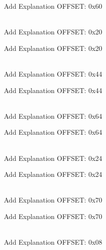 \begin{DoxyRefList}
\label{todo__todo000115}%
%
Add Explanation OFFSET\+: 0x60  
\item[{\parbox[t]{\linewidth}{Member \doxylink{struct_r_c_c___reg_def__t_acfa79aca8487958412be8f32e4632b47}{RCC\+\_\+\+Reg\+Def\+\_\+t\+::APB1\+RSTR} }}]\hfill \\
\label{todo__todo000029}%
%
Add Explanation OFFSET\+: 0x20 

\label{todo__todo000099}%
%
Add Explanation OFFSET\+: 0x20  
\item[{\parbox[t]{\linewidth}{Member \doxylink{struct_r_c_c___reg_def__t_aa5211a53246098ec97c0e360759c5ad8}{RCC\+\_\+\+Reg\+Def\+\_\+t\+::APB2\+ENR} }}]\hfill \\
\label{todo__todo000038}%
%
Add Explanation OFFSET\+: 0x44 

\label{todo__todo000108}%
%
Add Explanation OFFSET\+: 0x44  
\item[{\parbox[t]{\linewidth}{Member \doxylink{struct_r_c_c___reg_def__t_ab7a6c876d40b24bc87fa77108508271d}{RCC\+\_\+\+Reg\+Def\+\_\+t\+::APB2\+LPENR} }}]\hfill \\
\label{todo__todo000046}%
%
Add Explanation OFFSET\+: 0x64 

\label{todo__todo000116}%
%
Add Explanation OFFSET\+: 0x64  
\item[{\parbox[t]{\linewidth}{Member \doxylink{struct_r_c_c___reg_def__t_a6c1588013b885c32b78b912e8249a26c}{RCC\+\_\+\+Reg\+Def\+\_\+t\+::APB2\+RSTR} }}]\hfill \\
\label{todo__todo000030}%
%
Add Explanation OFFSET\+: 0x24 

\label{todo__todo000100}%
%
Add Explanation OFFSET\+: 0x24  
\item[{\parbox[t]{\linewidth}{Member \doxylink{struct_r_c_c___reg_def__t_a59a53b5462384295a8fb8ac51a2d77e2}{RCC\+\_\+\+Reg\+Def\+\_\+t\+::BDCR} }}]\hfill \\
\label{todo__todo000049}%
%
Add Explanation OFFSET\+: 0x70 

\label{todo__todo000119}%
%
Add Explanation OFFSET\+: 0x70  
\item[{\parbox[t]{\linewidth}{Member \doxylink{struct_r_c_c___reg_def__t_a79bc9c39e426da5615b0fb2cd72cf9a9}{RCC\+\_\+\+Reg\+Def\+\_\+t\+::CFGR} }}]\hfill \\
\label{todo__todo000023}%
%
Add Explanation OFFSET\+: 0x08 


\end{DoxyRefList}
